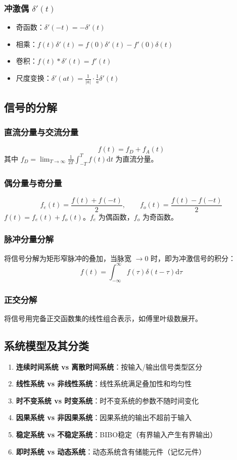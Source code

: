 \documentclass[11pt,a4paper]{ctexart}
\newcommand{\dd}{\mathrm{d}}            %
\newcommand{\dirac}{\delta}             %
\begin{document}
\subsubsection{冲激偶 $\dirac'(t)$}
\begin{itemize}
    \item 奇函数：$\dirac'(-t) = -\dirac'(t)$
    \item 相乘：$f(t)\dirac'(t) = f(0)\dirac'(t) - f'(0)\dirac(t)$
    \item 卷积：$f(t) * \dirac'(t) = f'(t)$
    \item 尺度变换：$\dirac'(at) = \frac{1}{|a|}\cdot\frac{1}{a}\dirac'(t)$
\end{itemize}

\subsection{信号的分解}

\subsubsection{直流分量与交流分量}
\[
f(t) = f_D + f_A(t)
\]
其中 $f_D = \lim_{T\to\infty}\frac{1}{2T}\int_{-T}^{T} f(t)\dd t$ 为直流分量。

\subsubsection{偶分量与奇分量}
\[
f_e(t) = \frac{f(t) + f(-t)}{2},\qquad f_o(t) = \frac{f(t) - f(-t)}{2}
\]
$f(t) = f_e(t) + f_o(t)$。$f_e$ 为偶函数，$f_o$ 为奇函数。

\subsubsection{脉冲分量分解}
将信号分解为矩形窄脉冲的叠加，当脉宽 $\to 0$ 时，即为冲激信号的积分：
\[
f(t) = \int_{-\infty}^{\infty} f(\tau)\dirac(t - \tau)\dd\tau
\]

\subsubsection{正交分解}
将信号用完备正交函数集的线性组合表示，如傅里叶级数展开。

\subsection{系统模型及其分类}

\begin{enumerate}
    \item \textbf{连续时间系统 vs 离散时间系统}：按输入/输出信号类型区分
    \item \textbf{线性系统 vs 非线性系统}：线性系统满足叠加性和均匀性
    \item \textbf{时不变系统 vs 时变系统}：时不变系统的参数不随时间变化
    \item \textbf{因果系统 vs 非因果系统}：因果系统的输出不超前于输入
    \item \textbf{稳定系统 vs 不稳定系统}：BIBO稳定（有界输入产生有界输出）
    \item \textbf{即时系统 vs 动态系统}：动态系统含有储能元件（记忆元件）
\end{enumerate}
\end{document}
